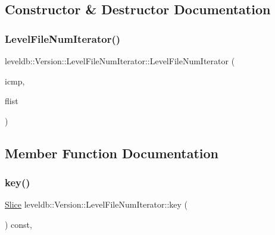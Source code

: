 \subsection{Constructor \& Destructor Documentation}
\mbox{\label{classleveldb_1_1_version_1_1_level_file_num_iterator_a7d9b5b7c74d74974ae322d20535f112a}} 
\subsubsection{\texorpdfstring{LevelFileNumIterator()}{LevelFileNumIterator()}}
{\footnotesize\ttfamily leveldb\+::\+Version\+::\+Level\+File\+Num\+Iterator\+::\+Level\+File\+Num\+Iterator (\begin{DoxyParamCaption}\item[{const \mbox{\hyperlink{classleveldb_1_1_internal_key_comparator}{Internal\+Key\+Comparator}} \&}]{icmp,  }\item[{const std\+::vector$<$ \mbox{\hyperlink{structleveldb_1_1_file_meta_data}{File\+Meta\+Data}} $\ast$ $>$ $\ast$}]{flist }\end{DoxyParamCaption})\hspace{0.3cm}{\ttfamily [inline]}}



\subsection{Member Function Documentation}
\mbox{\label{classleveldb_1_1_version_1_1_level_file_num_iterator_af89babdc6efb44a125b9ec597fc96bd8}} 
\subsubsection{\texorpdfstring{key()}{key()}}
{\footnotesize\ttfamily \mbox{\hyperlink{classleveldb_1_1_slice}{Slice}} leveldb\+::\+Version\+::\+Level\+File\+Num\+Iterator\+::key (\begin{DoxyParamCaption}{ }\end{DoxyParamCaption}) const\hspace{0.3cm}{\ttfamily [inline]}, {\ttfamily [virtual]}}



